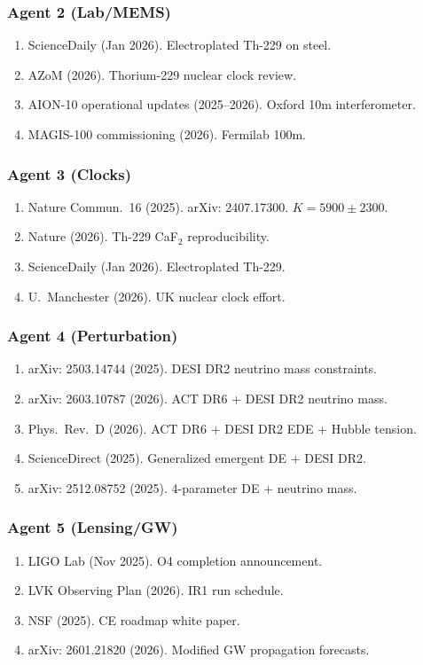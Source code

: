 \documentclass[11pt,a4paper]{article}
\begin{document}
\subsubsection{Agent 2 (Lab/MEMS)}
\begin{enumerate}
\item ScienceDaily (Jan 2026). Electroplated Th-229 on steel.
\item AZoM (2026). Thorium-229 nuclear clock review.
\item AION-10 operational updates (2025--2026). Oxford 10m interferometer.
\item MAGIS-100 commissioning (2026). Fermilab 100m.
\end{enumerate}

\subsubsection{Agent 3 (Clocks)}
\begin{enumerate}
\item Nature Commun.\ 16 (2025). arXiv: 2407.17300. $K = 5900 \pm 2300$.
\item Nature (2026). Th-229 CaF$_2$ reproducibility.
\item ScienceDaily (Jan 2026). Electroplated Th-229.
\item U.\ Manchester (2026). UK nuclear clock effort.
\end{enumerate}

\subsubsection{Agent 4 (Perturbation)}
\begin{enumerate}
\item arXiv: 2503.14744 (2025). DESI DR2 neutrino mass constraints.
\item arXiv: 2603.10787 (2026). ACT DR6 + DESI DR2 neutrino mass.
\item Phys.\ Rev.\ D (2026). ACT DR6 + DESI DR2 EDE + Hubble tension.
\item ScienceDirect (2025). Generalized emergent DE + DESI DR2.
\item arXiv: 2512.08752 (2025). 4-parameter DE + neutrino mass.
\end{enumerate}

\subsubsection{Agent 5 (Lensing/GW)}
\begin{enumerate}
\item LIGO Lab (Nov 2025). O4 completion announcement.
\item LVK Observing Plan (2026). IR1 run schedule.
\item NSF (2025). CE roadmap white paper.
\item arXiv: 2601.21820 (2026). Modified GW propagation forecasts.
\end{enumerate}
\end{document}
